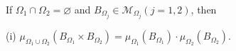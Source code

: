 If $\Omega_1 \cap \Omega_2 = \varnothing$ and $B_{\Omega_j} \in \mathcal{M}_{\Omega_j}(j = 1, 2)$, then

(i) $\mu_{\Omega_1 \cup \Omega_2}(B_{\Omega_1} \times B_{\Omega_2}) = \mu_{\Omega_1}(B_{\Omega_1}) \cdot \mu_{\Omega_2}(B_{\Omega_2})$.